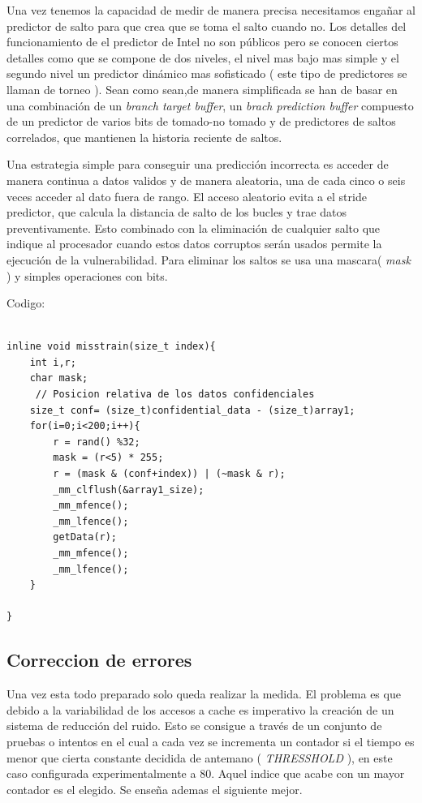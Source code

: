 \documentclass[paper=a4, fontsize=11pt]{scrartcl} %
\begin{document}
    Una vez tenemos la capacidad de medir de manera precisa necesitamos engañar al predictor de salto para que crea que se toma el salto cuando no. Los detalles del funcionamiento de el predictor de Intel no son públicos pero se conocen ciertos detalles\cite{milenkovic} como que se compone de dos niveles, el nivel mas bajo mas simple y el segundo nivel un predictor dinámico mas sofisticado ( este tipo de predictores se llaman de torneo ). Sean como sean,de manera simplificada se han de basar en una combinación de un \textit{branch target buffer}, un \textit{brach prediction buffer} compuesto de un predictor de varios bits de tomado-no tomado y de predictores de saltos correlados, que mantienen la historia reciente de saltos\cite{patterson}.

Una estrategia simple para conseguir una predicción incorrecta es acceder de manera continua a datos validos y de manera aleatoria, una de cada cinco o seis veces acceder al dato fuera de rango. El acceso aleatorio evita a el stride predictor, que calcula la distancia de salto de los bucles y trae datos preventivamente. Esto combinado con la eliminación de cualquier salto que indique al procesador cuando estos datos corruptos serán usados permite la ejecución de la vulnerabilidad. Para eliminar los saltos se usa una mascara( \textit{mask} ) y simples operaciones con bits.

Codigo: 
\begin{lstlisting}[frame=single, style=myCustomStyle]

inline void misstrain(size_t index){
    int i,r;
    char mask;
     // Posicion relativa de los datos confidenciales
    size_t conf= (size_t)confidential_data - (size_t)array1;
    for(i=0;i<200;i++){
        r = rand() %32;
        mask = (r<5) * 255;
        r = (mask & (conf+index)) | (~mask & r); 
        _mm_clflush(&array1_size);
        _mm_mfence();
        _mm_lfence();
        getData(r);
        _mm_mfence();
        _mm_lfence();
    }

}
\end{lstlisting}

\subsection{Correccion de errores}

Una vez esta todo preparado solo queda realizar la medida. El problema es que debido a la variabilidad de los accesos a cache es imperativo la creación de un sistema de reducción del ruido. Esto se consigue a través de un conjunto de pruebas o intentos en el cual a cada vez se incrementa un contador si el tiempo es menor que cierta constante decidida de antemano ( \textit{THRESSHOLD} ), en este caso configurada experimentalmente a 80. 
Aquel indice que acabe con un mayor contador es el elegido. Se enseña ademas el siguiente mejor.
\end{document}
